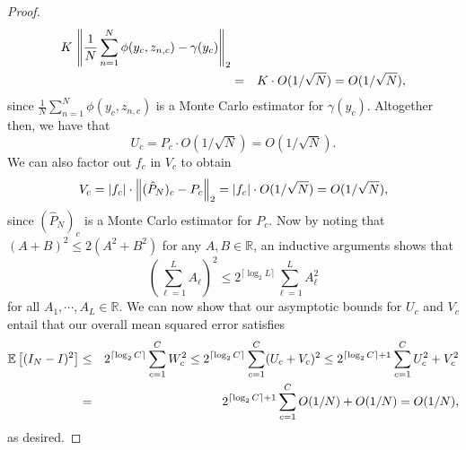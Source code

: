 \begin{proof}
\begin{eqnarray*}
		K \, \left\lVert\frac{1}{N} \sum_{n=1}^N \phi(y_c, z_{n,c}) - \gamma(y_c)\right\rVert_2  \\	
		&=& K \cdot O(1/\sqrt{N}) 
		= O(1/\sqrt{N}),
	\end{eqnarray*}
	since $\frac{1}{N} \sum_{n=1}^N \phi(y_c, z_{n,c})$ is a Monte Carlo estimator for
	$\gamma(y_c)$. Altogether then, we have that
	\[
	U_c = P_c \cdot O(1 / \sqrt{N}) = O(1 / \sqrt{N}).
	\]
	We can also factor out $f_c$ in $V_c$ to obtain
	\[
	V_c = |f_c| \cdot \left\lVert(\hat{P}_N)_c - P_c\right\rVert_2 = |f_c| \cdot O(1/\sqrt{N}) = O(1/\sqrt{N}),
	\]
	since $(\hat{P}_N)_c$ is a Monte Carlo estimator for $P_c$.
	Now by noting that 
	$(A+B)^2 \le 2(A^2+B^2)$
	for any $A, B \in \mathbb{R}$, an inductive arguments shows that 
	\[
	\left(\sum_{\ell=1}^L A_\ell\right)^2 \leq 2^{\lceil \log_2 L \rceil} \sum_{\ell=1}^L A_\ell^2
	\]
	for all $A_1, \cdots, A_L \in \mathbb{R}$.  We can now show that
	our asymptotic bounds for $U_c$ and $V_c$ entail that our overall mean squared
	error satisfies
	\begin{eqnarray}
	\mathbb{E}\left[(I_N - I)^2\right] &\leq& 2^{\lceil \log_2 C \rceil} \sum_{c=1}^C W_c^2 \label{eq:square-inequal-1} \notag
	\leq 2^{\lceil \log_2 C \rceil} \sum_{c=1}^C (U_c + V_c)^2 \notag
	\leq 2^{\lceil \log_2 C \rceil + 1} \sum_{c=1}^C U_c^2 + V_c^2 \label{eq:square-inequal-2} \notag \\
	&=& 2^{\lceil \log_2 C \rceil + 1} \sum_{c=1}^C O(1/N) + O(1/N) \notag
	= O(1/N), \notag
	\end{eqnarray}
	as desired.
\end{proof}
